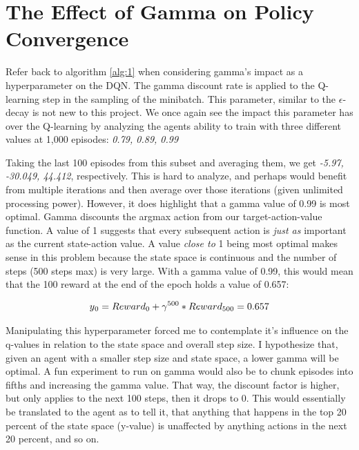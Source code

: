 \documentclass[conference]{IEEEtran}
\begin{document}
\section{The Effect of Gamma on Policy Convergence}
Refer back to algorithm \ref{alg:1} when considering gamma's impact as a hyperparameter on the DQN. The gamma discount rate is applied to the Q-learning step in the sampling of the minibatch. This parameter, similar to the $\epsilon$-decay is not new to this project. We once again see the impact this parameter has over the Q-learning by analyzing the agents ability to train with three different values at 1,000 episodes: \textit{0.79, 0.89, 0.99}

Taking the last 100 episodes from this subset and averaging them, we get \textit{-5.97, -30.049, 44.412}, respectively. This is hard to analyze, and perhaps would benefit from multiple iterations and then average over those iterations (given unlimited processing power). However, it does highlight that a gamma value of 0.99 is most optimal. Gamma discounts the argmax action from our target-action-value function. A value of 1 suggests that every subsequent action is \textit{just as} important as the current state-action value. A value \textit{close to} 1 being most optimal makes sense in this problem because the state space is continuous and the number of steps (500 steps max) is very large. With a gamma value of 0.99, this would mean that the 100 reward at the end of the epoch holds a value of 0.657:

\begin{equation}
    y\textsubscript{0} = Reward\textsubscript{0} + \gamma\textsuperscript{500} * Reward\textsubscript{500} = 0.657
\end{equation}

Manipulating this hyperparameter forced me to contemplate it's influence on the q-values in relation to the state space and overall step size. I hypothesize that, given an agent with a smaller step size and state space, a lower gamma will be optimal. A fun experiment to run on gamma would also be to chunk episodes into fifths and increasing the gamma value. That way, the discount factor is higher, but only applies to the next 100 steps, then it drops to 0. This would essentially be translated to the agent as to tell it, that anything that happens in the top 20 percent of the state space (y-value) is unaffected by anything actions in the next 20 percent, and so on.
\end{document}
